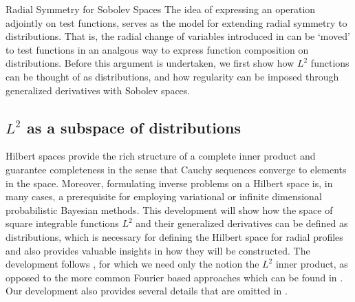 \begin{chapter}{Radial Symmetry for Sobolev Spaces}
The idea of expressing an operation adjointly on test functions, serves as the model for extending radial symmetry to distributions. 
That is, the radial change of variables introduced in  can be `moved' to test functions in an analgous way to express function composition on distributions.
Before this argument is undertaken, we first show how $L^2$ functions can be thought of as distributions, and how regularity can be imposed through generalized derivatives with Sobolev spaces.

\subsection{$L^2$ as a subspace of distributions}

Hilbert spaces provide the rich structure of a complete inner product and guarantee completeness in the sense that Cauchy sequences converge to elements in the space.
Moreover, formulating inverse problems on a Hilbert space is, in many cases, a prerequisite for employing variational or infinite dimensional probabilistic Bayesian methods.
This development will show how the space of square integrable functions $L^2$ and their generalized derivatives can be defined as distributions, which is necessary for defining the Hilbert space for radial profiles and also provides valuable insights in how they will be constructed.
The development follows \citep{richtmyer1978principles,griffel2002}, for which we need only the notion the $L^2$ inner product, as opposed to the more common Fourier based approaches which can be found in \citep{rudin1991,hormander1983,strichartz2000}.
Our development also provides several details that are omitted in \citep{richtmyer1978principles}. 


\end{chapter}
